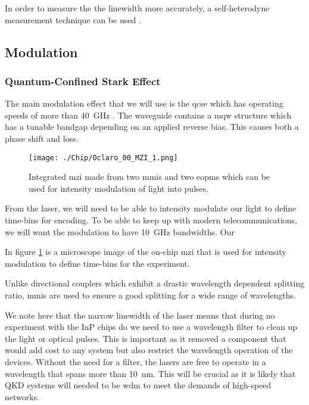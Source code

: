 In order to measure the the linewidth more accurately, a self-heterodyne measurement technique can be used \cite{self-heterodyne}. 

\subsection{Modulation}

\subsubsection{Quantum-Confined Stark Effect}

The main modulation effect that we will use is the \ac{qcse} which has operating speeds of more than \SI{40}{GHz} \cite{qcse, smit2014}. The waveguide contains a \ac{mqw}  structure which has a tunable bandgap depending on an applied reverse bias. This causes both a phase shift and loss.

\begin{figure}[tbp]
	\texttt{[image: ./Chip/Oclaro\_00\_MZI\_1.png]}
	\caption[Integrated MZI microscope image]{Integrated \acl{mzi} made from two \acsp{mmi} and two \acsp{eopm}  which can be used for intensity modulation of light into pulses.}
	\label{fig:InP_MZI}
\end{figure}

From the laser, we will need to be able to intensity modulate our light to define time-bins for encoding. To be able to keep up with modern telecommunications, we will want the modulation to have \SI{10}{GHz} bandwidths. Our

In figure \ref{fig:InP_MZI} is a microscope image of the on-chip \ac{mzi} that is used for intensity modulation to define time-bins for the experiment.

Unlike directional couplers which exhibit a drastic wavelength dependent splitting ratio, \acp{mmi} are used to ensure a good splitting for a wide range of wavelengths. 

We note here that the narrow linewidth of the laser means that during no experiment with the \ac{InP} chips do we need to use a wavelength filter to clean up the light or optical pulses. This is important as it removed a component that would add cost to any system but also restrict the wavelength operation of the devices. Without the need for a filter, the lasers are free to operate in a wavelength that spans more than \SI{10}{nm}. This will be crucial as it is likely that \ac{QKD} systems will needed to be \ac{wdm} to meet the demands of high-speed networks.

